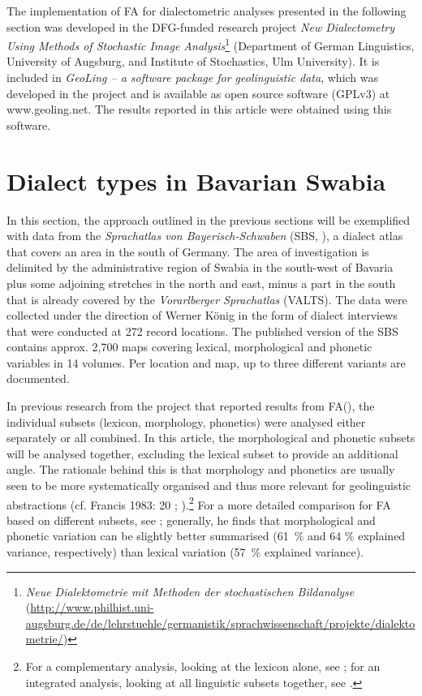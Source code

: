 \documentclass[output=paper]{LSP/langsci}
\begin{document}
The implementation of FA for dialectometric analyses presented in the following section was developed in the DFG-funded research project \textit{New Dialectometry Using Methods of Stochastic Image Analysis}\footnote{   \textit{Neue Dialektometrie mit Methoden der stochastischen Bildanalyse} \\
(\url{http://www.philhist.uni-augsburg.de/de/lehrstuehle/germanistik/sprachwissenschaft/projekte/dialektometrie/})} (Department of German Linguistics, University of Augsburg, and Institute of Stochastics, Ulm University). It is included in \textit{GeoLing – a software package for geolinguistic data}, which was developed in the project and is available as open source software (GPLv3) at www.geoling.net. The results reported in this article were obtained using this software.

\section{Dialect types in Bavarian Swabia}

In this section, the approach outlined in the previous sections will be exemplified with data from the \textit{Sprachatlas von Bayerisch-Schwaben} (SBS, \citealt{konig_sprachatlas_1996}), a dialect atlas that covers an area in the south of Germany. The area of investigation is delimited by the administrative region of Swabia in the south-west of Bavaria plus some adjoining stretches in the north and east, minus a part in the south that is already covered by the \textit{Vorarlberger Sprachatlas} (VALTS). The data were collected under the direction of Werner König in the form of dialect interviews that were conducted at 272 record locations. The published version of the SBS contains approx. 2,700 maps covering lexical, morphological and phonetic variables in 14 volumes. Per location and map, up to three different variants are documented.

In previous research from the project that reported results from FA(\cite{pickl_probabilistische_2013,pickl_verdichtungen_2013,buhler_dialektraume_2014,proll_raumvariation_2015,proll_raumvariation_2015}), the individual subsets (lexicon, morphology, phonetics) were analysed either separately or all combined. In this article, the morphological and phonetic subsets will be analysed together, excluding the lexical subset to provide an additional angle. The rationale behind this is that morphology and phonetics are usually seen to be more systematically organised and thus more relevant for geolinguistic abstractions (cf. Francis 1983: 20%
; \citealt[41, 119]{labov_atlas_2006-1}).\footnote{For a complementary analysis, looking at the lexicon alone, see \citet{pickl_probabilistische_2013,pickl_verdichtungen_2013}; for an integrated analysis, looking at all linguistic subsets together, see \citet{proll_raumvariation_2015}.} For a more detailed comparison for FA based on different subsets, see \citet[84--132]{proll_raumvariation_2015}; generally, he finds that morphological and phonetic variation can be slightly better summarised (61~\% and 64 \% explained variance, respectively) than lexical variation (57~\% explained variance).
\end{document}
